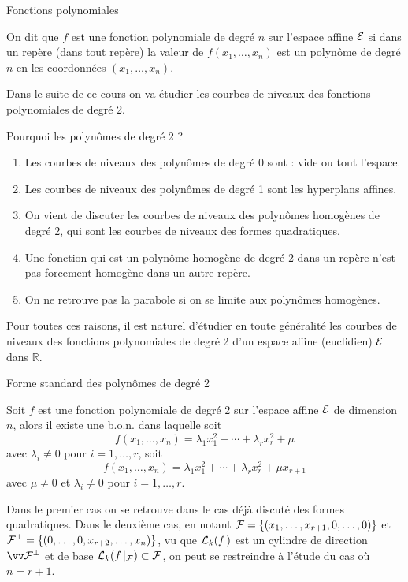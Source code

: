 \documentclass[11pt]{m53beamer}
\begin{document}
\begin{frame}{Fonctions polynomiales}
  \begin{defprop}
    On dit que $f$ est une \alert{fonction polynomiale} de degré $n$ sur l'espace affine $\mathcal{E}$ si dans un repère (dans tout repère) la valeur de $f(x_{1},\ldots,x_{n})$ est un polynôme de degré $n$ en les coordonnées $(x_{1},\ldots,x_{n})$.
  \end{defprop}\pause
  Dans le suite de ce cours on va étudier les courbes de niveaux des fonctions polynomiales de degré 2.
\end{frame}

\begin{frame}{Pourquoi les polynômes de degré 2 ?}
  \begin{enumerate}[<+(1)->]
    \item Les courbes de niveaux des polynômes de degré 0 sont : vide ou tout l'espace.
    \item Les courbes de niveaux des polynômes de degré 1 sont les hyperplans affines.
    \item On vient de discuter les courbes de niveaux des polynômes homogènes de degré 2, qui sont les courbes de niveaux des formes quadratiques.
    \item Une fonction qui est un polynôme homogène de degré 2 dans un repère n'est pas forcement homogène dans un autre repère.
    \item On ne retrouve pas la parabole si on se limite aux polynômes homogènes.
  \end{enumerate}\pause
  Pour toutes ces raisons, il est naturel d'étudier en toute généralité les courbes de niveaux des fonctions polynomiales de degré 2 d'un espace affine (euclidien) $\mathcal{E}$ dans $\mathbb{R}$.
\end{frame}

\begin{frame}{Forme standard des polynômes de degré 2}
  \begin{proposition}
    Soit $f$ est une fonction polynomiale de degré $2$ sur l'espace affine $\mathcal{E}$ de dimension $n$, alors il existe une b.o.n. dans laquelle soit
    \[
      f(x_{1},\ldots,x_{n}) = \lambda_{1}x_{1}^{2}+\cdots+\lambda_{r}x_{r}^{2}+\mu
    \]
    avec $\lambda_{i}\neq 0$ pour $i=1,\ldots,r$\pause, soit
    \[
      f(x_{1},\ldots,x_{n}) = \lambda_{1}x_{1}^{2}+\cdots+\lambda_{r}x_{r}^{2}+\mu x_{r+1}
    \]
     avec $\mu\neq0$ et $\lambda_{i}\neq 0$ pour $i=1,\ldots,r$.
  \end{proposition}\pause
  Dans le premier cas on se retrouve dans le cas déjà discuté des formes quadratiques.\pause\newline
  Dans le deuxième cas, en notant $\mathcal{F}=\{(x_{1},\ldots,x_{r+1},0,\ldots,0)\}$ et $\mathcal{F}^{\perp}=\{(0,\ldots,0,x_{r+2},\ldots,x_{n})\}$, vu que $\mathcal{L}_{k}(f\,)$ est un cylindre de direction $\ev{F^{\perp}}$ et de base $\mathcal{L}_{k}(f\,|_{\mathcal{F}}) \subset \mathcal{F}$, on peut se restreindre à l'étude du cas où $n=r+1$.
\end{frame}
\end{document}
